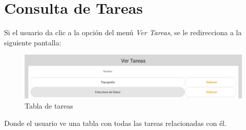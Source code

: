 \section{Consulta de Tareas}
        Si el usuario da clic a la opción del menú \textit{Ver Tareas}, se le redirecciona a la siguiente pantalla:
        \begin{figure}[H]
            \centering
            \hypertarget{asignart}{\includegraphics[width=0.7\linewidth]{images/Tareas/Vertareas}}
            \caption{Tabla de tareas}
            \label{asignart}
        \end{figure}
        Donde el usuario ve una tabla con todas las tareas relacionadas con él.

